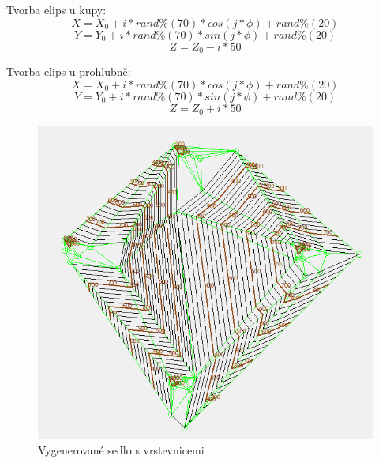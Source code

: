 \documentclass[a4paper,11pt,twoside]{article}
\begin{document}
Tvorba elips u kupy:
$$
X = X_0 + i * rand\%(70) * cos(j*\phi) + rand\%(20)
$$
$$
Y =  Y_0 + i * rand\%(70) * sin(j*\phi) + rand\%(20)
$$
$$
Z = Z_0 - i * 50
$$

Tvorba elips u prohlubně:
$$
X = X_0 + i * rand\%(70) * cos(j*\phi) + rand\%(20)
$$
$$
Y =  Y_0 + i * rand\%(70) * sin(j*\phi) + rand\%(20)
$$
$$
Z = Z_0 + i * 50
$$

\vspace{0.2cm}
\begin{figure}[hbt!] 
\begin{center}
\includegraphics[width=14cm]{pictures/sedlo.PNG} 
\caption[Vygenerovanéí sedlo s vrstevnicemi]{Vygenerované sedlo s vrstevnicemi}
\label{fig:sedlo}
\end{center}
\end{figure}

\newpage
\vspace*{-1cm}
\end{document}
